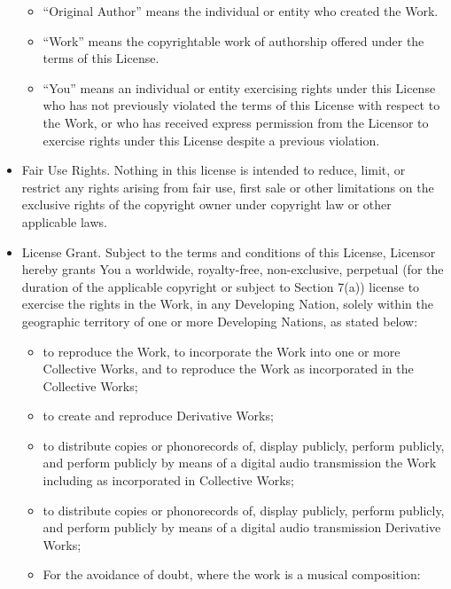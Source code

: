 \documentclass{article}
\begin{document}
\begin{itemize}
\begin{itemize}
\item ``Original Author'' means the individual or entity who created
the Work.

\item ``Work'' means the copyrightable work of authorship offered under
the terms of this License.

\item ``You'' means an individual or entity exercising rights under
this License who has not previously violated the terms of this License
with respect to the Work, or who has received express permission from
the Licensor to exercise rights under this License despite a previous
violation.\end{itemize}


\item Fair Use Rights.  Nothing in this license is intended to reduce,
limit, or restrict any rights arising from fair use, first sale or
other limitations on the exclusive rights of the copyright owner under
copyright law or other applicable laws.

\item License Grant.  Subject to the terms and conditions of this
License, Licensor hereby grants You a worldwide, royalty-free,
non-exclusive, perpetual (for the duration of the applicable copyright
or subject to Section 7(a)) license to exercise the rights in the
Work, in any Developing Nation, solely within the geographic territory
of one or more Developing Nations, as stated below:

\begin{itemize} \item to reproduce the Work, to incorporate the Work
into one or more Collective Works, and to reproduce the Work as
incorporated in the Collective Works;

\item to create and reproduce Derivative Works;

\item to distribute copies or phonorecords of, display publicly,
perform publicly, and perform publicly by means of a digital audio
transmission the Work including as incorporated in Collective Works;

\item to distribute copies or phonorecords of, display publicly,
perform publicly, and perform publicly by means of a digital audio
transmission Derivative Works;

\item

For the avoidance of doubt, where the work is a musical composition:


\end{itemize}
\end{itemize}
\end{document}
